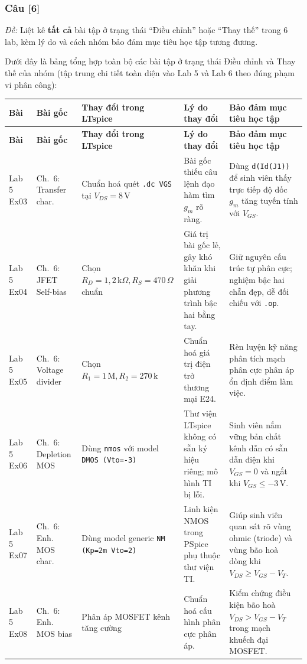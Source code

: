 \documentclass[12pt,a4paper]{article}
\newcommand{\hc}[1]{\cellcolor{navy}\color{white}\sffamily\bfseries\small #1}
\newcommand{\cauhoi}[2]{%
  \subsubsection{Câu [#1]}
  \begin{tcolorbox}[colback=white,colframe=guidegray!70,boxrule=0.4pt,arc=1pt,left=5pt,right=5pt,top=2pt,bottom=2pt]
  \small\textit{Đề:} #2
  \end{tcolorbox}
  \par\vspace{4pt}}
\begin{document}
\cauhoi{6}{Liệt kê \textbf{tất cả} bài tập ở trạng thái ``Điều chỉnh'' hoặc ``Thay thế'' trong 6 lab, kèm lý do và cách nhóm bảo đảm mục tiêu học tập tương đương.}

Dưới đây là bảng tổng hợp toàn bộ các bài tập ở trạng thái Điều chỉnh và Thay thế của nhóm (tập trung chi tiết toàn diện vào Lab 5 và Lab 6 theo đúng phạm vi phân công):

{\small
\renewcommand{\arraystretch}{1.2}
\setlength{\tabcolsep}{3.5pt}
\begin{longtable}{|p{1.5cm}|p{2.5cm}|p{3.1cm}|p{3.7cm}|p{3.8cm}|}
\hline
\hc{Bài} & \hc{Bài gốc} & \hc{Thay đổi trong LTspice} & \hc{Lý do thay đổi} & \hc{Bảo đảm mục tiêu học tập}\\ \hline
\endfirsthead
\hline
\hc{Bài} & \hc{Bài gốc} & \hc{Thay đổi trong LTspice} & \hc{Lý do thay đổi} & \hc{Bảo đảm mục tiêu học tập}\\ \hline
\endhead
Lab 5 Ex03 & Ch.~6: Transfer char. & Chuẩn hoá quét \texttt{.dc VGS} tại $V_{DS}=8\,\text{V}$ & Bài gốc thiếu câu lệnh đạo hàm tìm $g_m$ rõ ràng. & Dùng \texttt{d(Id(J1))} để sinh viên thấy trực tiếp độ dốc $g_m$ tăng tuyến tính với $V_{GS}$. \\ \hline
Lab 5 Ex04 & Ch.~6: JFET Self-bias & Chọn $R_D=1{,}2\,\text{k}\Omega, R_S=470\,\Omega$ chuẩn & Giá trị bài gốc lẻ, gây khó khăn khi giải phương trình bậc hai bằng tay. & Giữ nguyên cấu trúc tự phân cực; nghiệm bậc hai chẵn đẹp, dễ đối chiếu với \texttt{.op}. \\ \hline
Lab 5 Ex05 & Ch.~6: Voltage divider & Chọn $R_1=1\,\text{M}, R_2=270\,\text{k}$ & Chuẩn hoá giá trị điện trở thương mại E24. & Rèn luyện kỹ năng phân tích mạch phân cực phân áp ổn định điểm làm việc. \\ \hline
Lab 5 Ex06 & Ch.~6: Depletion MOS & Dùng \texttt{nmos} với model \texttt{DMOS (Vto=-3)} & Thư viện LTspice không có sẵn ký hiệu riêng; mô hình TI bị lỗi. & Sinh viên nắm vững bản chất kênh dẫn có sẵn dẫn điện khi $V_{GS}=0$ và ngắt khi $V_{GS} \le -3\,\text{V}$. \\ \hline
Lab 5 Ex07 & Ch.~6: Enh. MOS char. & Dùng model generic \texttt{NM (Kp=2m Vto=2)} & Linh kiện NMOS trong PSpice phụ thuộc thư viện TI. & Giúp sinh viên quan sát rõ vùng ohmic (triode) và vùng bão hoà dòng khi $V_{DS} \ge V_{GS}-V_T$. \\ \hline
Lab 5 Ex08 & Ch.~6: Enh. MOS bias & Phân áp MOSFET kênh tăng cường & Chuẩn hoá cấu hình phân cực phân áp. & Kiểm chứng điều kiện bão hoà $V_{DS} > V_{GS} - V_T$ trong mạch khuếch đại MOSFET. \\ \hline

\end{longtable}}
\end{document}
